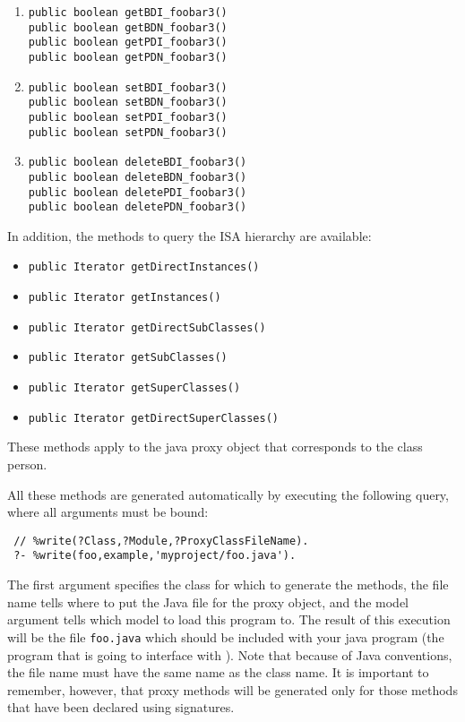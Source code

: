 \begin{enumerate}
\item  {\tt public boolean getBDI\_foobar3()}   \\
  {\tt public boolean getBDN\_foobar3()} \\
  {\tt public boolean getPDI\_foobar3()}   \\
  {\tt public boolean getPDN\_foobar3()}
\item {\tt public boolean setBDI\_foobar3()}   \\
  {\tt public boolean setBDN\_foobar3()} \\
  {\tt public boolean setPDI\_foobar3()}   \\
  {\tt public boolean setPDN\_foobar3()}
\item {\tt public boolean deleteBDI\_foobar3()}  \\
  {\tt public boolean deleteBDN\_foobar3()}  \\
  {\tt public boolean deletePDI\_foobar3()}  \\
  {\tt public boolean deletePDN\_foobar3()}  
\end{enumerate}

In addition, the methods to query the ISA hierarchy are available:
\begin{itemize}
\item  {\tt public Iterator getDirectInstances()}
\item  {\tt public Iterator getInstances()}
\item  {\tt public Iterator getDirectSubClasses()}
\item  {\tt public Iterator getSubClasses()}
\item   {\tt public Iterator getSuperClasses()}   
\item   {\tt public Iterator getDirectSuperClasses()}   
\end{itemize}
These methods apply to the java proxy object that corresponds to the \fl
class person.

All these methods are generated automatically by executing the following
\FLORA query, where all arguments must be bound:
\begin{verbatim}
 // %write(?Class,?Module,?ProxyClassFileName).
 ?- %write(foo,example,'myproject/foo.java').
\end{verbatim}
The first argument specifies the class for which to generate the methods,
the file name tells where to put the Java file for the proxy object,
and the model argument tells which \FLORA model to load this program to. The
result of this execution will be the file {\tt foo.java} which should be
included with your java program (the program that is going to interface with
\FLORA). Note that because of Java conventions, the file name must have
the same name as the class name.
It is important to remember, however, that proxy methods will
be generated only for those \fl methods that have been declared using
signatures.

